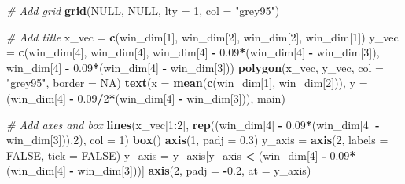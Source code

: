 \documentclass[12pt,]{krantz}
\newenvironment{Shaded}{\begin{snugshade}}{\end{snugshade}}
\newcommand{\KeywordTok}[1]{\textcolor[rgb]{0.27,0.27,0.27}{\textbf{#1}}}
\newcommand{\DataTypeTok}[1]{\textcolor[rgb]{0.27,0.27,0.27}{#1}}
\newcommand{\DecValTok}[1]{\textcolor[rgb]{0.06,0.06,0.06}{#1}}
\newcommand{\FloatTok}[1]{\textcolor[rgb]{0.06,0.06,0.06}{#1}}
\newcommand{\StringTok}[1]{\textcolor[rgb]{0.5,0.5,0.5}{#1}}
\newcommand{\CommentTok}[1]{\textcolor[rgb]{0.37,0.37,0.37}{\textit{#1}}}
\newcommand{\OtherTok}[1]{\textcolor[rgb]{0.37,0.37,0.37}{#1}}
\newcommand{\OperatorTok}[1]{\textcolor[rgb]{0.43,0.43,0.43}{\textbf{#1}}}
\newcommand{\NormalTok}[1]{#1}
\begin{document}
\begin{Shaded}
\begin{Highlighting}[]
\CommentTok{# Add grid}
\KeywordTok{grid}\NormalTok{(}\OtherTok{NULL}\NormalTok{, }\OtherTok{NULL}\NormalTok{, }\DataTypeTok{lty =} \DecValTok{1}\NormalTok{, }\DataTypeTok{col =} \StringTok{"grey95"}\NormalTok{)}

\CommentTok{# Add title}
\NormalTok{x_vec =}\StringTok{ }\KeywordTok{c}\NormalTok{(win_dim[}\DecValTok{1}\NormalTok{], win_dim[}\DecValTok{2}\NormalTok{], win_dim[}\DecValTok{2}\NormalTok{], win_dim[}\DecValTok{1}\NormalTok{])}
\NormalTok{y_vec =}\StringTok{ }\KeywordTok{c}\NormalTok{(win_dim[}\DecValTok{4}\NormalTok{], win_dim[}\DecValTok{4}\NormalTok{],}
\NormalTok{            win_dim[}\DecValTok{4}\NormalTok{] }\OperatorTok{-}\StringTok{ }\FloatTok{0.09}\OperatorTok{*}\NormalTok{(win_dim[}\DecValTok{4}\NormalTok{] }\OperatorTok{-}\StringTok{ }\NormalTok{win_dim[}\DecValTok{3}\NormalTok{]),}
\NormalTok{            win_dim[}\DecValTok{4}\NormalTok{] }\OperatorTok{-}\StringTok{ }\FloatTok{0.09}\OperatorTok{*}\NormalTok{(win_dim[}\DecValTok{4}\NormalTok{] }\OperatorTok{-}\StringTok{ }\NormalTok{win_dim[}\DecValTok{3}\NormalTok{]))}
\KeywordTok{polygon}\NormalTok{(x_vec, y_vec, }\DataTypeTok{col =} \StringTok{"grey95"}\NormalTok{, }\DataTypeTok{border =} \OtherTok{NA}\NormalTok{)}
\KeywordTok{text}\NormalTok{(}\DataTypeTok{x =} \KeywordTok{mean}\NormalTok{(}\KeywordTok{c}\NormalTok{(win_dim[}\DecValTok{1}\NormalTok{], win_dim[}\DecValTok{2}\NormalTok{])), }\DataTypeTok{y =}\NormalTok{ (win_dim[}\DecValTok{4}\NormalTok{] }\OperatorTok{-}\StringTok{ }\FloatTok{0.09}\OperatorTok{/}\DecValTok{2}\OperatorTok{*}\NormalTok{(win_dim[}\DecValTok{4}\NormalTok{] }\OperatorTok{-}\StringTok{ }\NormalTok{win_dim[}\DecValTok{3}\NormalTok{])), main)}

\CommentTok{# Add axes and box}
\KeywordTok{lines}\NormalTok{(x_vec[}\DecValTok{1}\OperatorTok{:}\DecValTok{2}\NormalTok{], }\KeywordTok{rep}\NormalTok{((win_dim[}\DecValTok{4}\NormalTok{] }\OperatorTok{-}\StringTok{ }\FloatTok{0.09}\OperatorTok{*}\NormalTok{(win_dim[}\DecValTok{4}\NormalTok{] }\OperatorTok{-}\StringTok{ }\NormalTok{win_dim[}\DecValTok{3}\NormalTok{])),}\DecValTok{2}\NormalTok{), }\DataTypeTok{col =} \DecValTok{1}\NormalTok{)}
\KeywordTok{box}\NormalTok{()}
\KeywordTok{axis}\NormalTok{(}\DecValTok{1}\NormalTok{, }\DataTypeTok{padj =} \FloatTok{0.3}\NormalTok{)}
\NormalTok{y_axis =}\StringTok{ }\KeywordTok{axis}\NormalTok{(}\DecValTok{2}\NormalTok{, }\DataTypeTok{labels =} \OtherTok{FALSE}\NormalTok{, }\DataTypeTok{tick =} \OtherTok{FALSE}\NormalTok{)}
\NormalTok{y_axis =}\StringTok{ }\NormalTok{y_axis[y_axis }\OperatorTok{<}\StringTok{ }\NormalTok{(win_dim[}\DecValTok{4}\NormalTok{] }\OperatorTok{-}\StringTok{ }\FloatTok{0.09}\OperatorTok{*}\NormalTok{(win_dim[}\DecValTok{4}\NormalTok{] }\OperatorTok{-}\StringTok{ }\NormalTok{win_dim[}\DecValTok{3}\NormalTok{]))]}
\KeywordTok{axis}\NormalTok{(}\DecValTok{2}\NormalTok{, }\DataTypeTok{padj =} \OperatorTok{-}\FloatTok{0.2}\NormalTok{, }\DataTypeTok{at =}\NormalTok{ y_axis)}


\end{Highlighting}
\end{Shaded}
\end{document}
